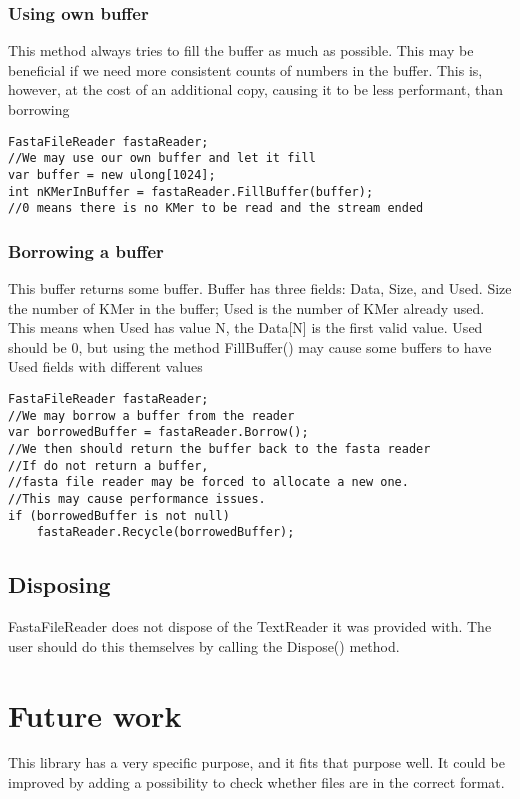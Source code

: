 \subsubsection{Using own buffer}
This method always tries to fill the buffer as much as possible. This may be beneficial if we need more consistent counts of numbers in the buffer. This is, however, at the cost of an additional copy, causing it to be less performant, than borrowing
\begin{lstlisting}
FastaFileReader fastaReader;
//We may use our own buffer and let it fill
var buffer = new ulong[1024];
int nKMerInBuffer = fastaReader.FillBuffer(buffer);
//0 means there is no KMer to be read and the stream ended
\end{lstlisting}
\subsubsection{Borrowing a buffer}
This buffer returns some buffer. Buffer has three fields: Data, Size, and Used. Size the number of KMer in the buffer; Used is the number of KMer already used. This means when Used has value N, the Data[N] is the first valid value. Used should be 0, but using the method FillBuffer() may cause some buffers to have Used fields with different values

\begin{lstlisting}
FastaFileReader fastaReader;
//We may borrow a buffer from the reader 
var borrowedBuffer = fastaReader.Borrow();
//We then should return the buffer back to the fasta reader
//If do not return a buffer,
//fasta file reader may be forced to allocate a new one.
//This may cause performance issues.
if (borrowedBuffer is not null) 
    fastaReader.Recycle(borrowedBuffer);
\end{lstlisting}
\subsection{Disposing}
FastaFileReader does not dispose of the TextReader it was provided with. The user should do this themselves by calling the Dispose() method.

\section{Future work}
This library has a very specific purpose, and it fits that purpose well. It could be improved by adding a possibility to check whether files are in the correct format. 
